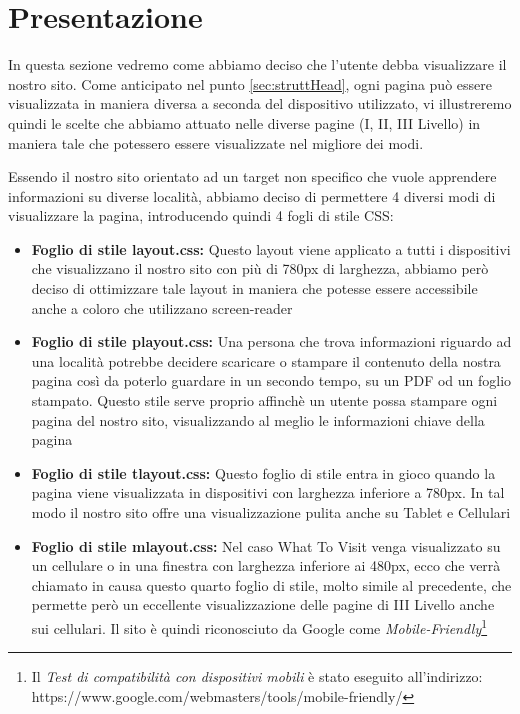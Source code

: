 \section{Presentazione}\label{sec:presentazione}
In questa sezione vedremo come abbiamo deciso che l'utente debba visualizzare il nostro sito.
Come anticipato nel punto \ref{sec:struttHead}, ogni pagina può essere visualizzata in maniera diversa a seconda del dispositivo utilizzato, vi illustreremo quindi le scelte che abbiamo attuato nelle diverse pagine (I, II, III Livello) in maniera tale che potessero essere visualizzate nel migliore dei modi.

Essendo il nostro sito orientato ad un target non specifico che vuole apprendere informazioni su diverse località, abbiamo deciso di permettere 4 diversi modi di visualizzare la pagina, introducendo quindi 4 fogli di stile CSS:
\begin{itemize}
\item \textbf{Foglio di stile layout.css:} Questo layout viene applicato a tutti i dispositivi che visualizzano il nostro sito con più di 780px di larghezza, abbiamo però deciso di ottimizzare tale layout in maniera che potesse essere accessibile anche a coloro che utilizzano screen-reader
\item \textbf{Foglio di stile playout.css:} Una persona che trova informazioni riguardo ad una località potrebbe decidere scaricare o stampare il contenuto della nostra pagina così da poterlo guardare in un secondo tempo, su un PDF od un foglio stampato. Questo stile serve proprio affinchè un utente possa stampare ogni pagina del nostro sito, visualizzando al meglio le informazioni chiave della pagina
\item \textbf{Foglio di stile tlayout.css:} Questo foglio di stile entra in gioco quando la pagina viene visualizzata in dispositivi con larghezza inferiore a 780px. In tal modo il nostro sito offre una visualizzazione pulita anche su Tablet e Cellulari
\item \textbf{Foglio di stile mlayout.css:} Nel caso What To Visit venga visualizzato su un cellulare o in una finestra con larghezza inferiore ai 480px, ecco che verrà chiamato in causa questo quarto foglio di stile, molto simile al precedente, che permette però un eccellente visualizzazione delle pagine di III Livello anche sui cellulari. Il sito è quindi riconosciuto da Google come \textit{Mobile-Friendly}\footnote{Il \textit{Test di compatibilità con dispositivi mobili} è stato eseguito all'indirizzo: https://www.google.com/webmasters/tools/mobile-friendly/}
\end{itemize}

